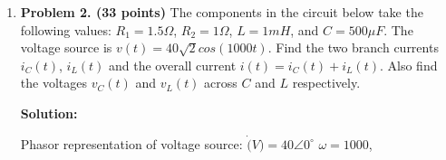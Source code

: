 \begin{enumerate}
\begin{comment}
  \item ({\bf 11 pts})
    In the figure above, it is know that $R=10\Omega$, $L=100\,mH$,
    and $C=500\,\mu F$, and the current through the loop is known to be
    $i(t)=\cos(100\,t)\,A$, find all four voltages $v_0(t)$, $v_1(t)$, 
    $v_2(t)$, and $v_3(t)$.

    {\bf Solution:} 
    $V_0=5$. $V_1=V_2=0$, $V_3=10$.

    \[
    \left\{\begin{array}{lll}
    v_1(t)=R i(t)=10\cos(100\,t)\\
    v_2(t)=Z_L i(t)=j\omega L i(t)=100\times 0.1 \cos(100\,t+\pi/2)=10\cos(100\,t+\pi/2)\\
    v_3(t)=Z_C i(t)=1/(j\omega C) i(t)=1/(100\times 500\times 10^{-6})\cos(100\,t)=20\cos(100,\,t-\pi/2)
    \end{array}\right.
    \]
    \[
    V_0=V_1+V_2+V_3=10+10\angle\pi/2+20\angle(-\pi/2)=10+10\angle(-\pi/2)
    \]
    \[
    v_0(t)=10\sqrt{2}\cos(100t-\pi/4)
    \]

  \item ({\bf 11 pts})
    The RMS values of the three currents through R, L, and C measured 
    by the three ammeters $A_1$, $A_2$, and $A_3$ are $I_1=4\,A$, $I_2=5\,A$, 
    and $I_3=2\,A$, respectively. Find the RMS value of the source current 
    $I_0$. If the AC voltage source is replaced by a DC current source 
    $I_0=1\,A$, Find the three currents $I_1$, $I_2$, and $I_3$ measured 
    respectively by ammeters $A_1$, $A_2$, and $A_3$.

    \htmladdimg{../../lectures/figures/Problems11.png}

    {\bf Solution:} $I_0=5$. $I_2=1$, $I_1=I_3=0$.
    

  \end{itemize}
\end{comment}

\item {\bf Problem 2. (33 points)} 
  The components in the circuit below take the following values:
  $R_1=1.5\Omega$, $R_2=1\Omega$, $L=1mH$, and $C=500\mu F$. The voltage
  source is $v(t)=40\sqrt{2} cos(1000t)$. Find the two branch currents 
  $i_C(t)$, $i_L(t)$ and the overall current $i(t)=i_C(t)+i_L(t)$.
  Also find the voltages $v_C(t)$ and $v_L(t)$ across $C$ and $L$
  respectively.

  {\bf Solution:} 

  Phasor representation of voltage source: $\dot(V)=40\angle{0^\circ}$
  $\omega=1000$, 


\end{enumerate}
